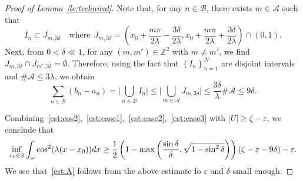 \documentclass[10pt,a4paper]{amsart}
\newcommand{\R}{\mathbb{R}}
\def \d {{\rm{d}}}
\begin{document}
\begin{proof}[Proof of Lemma~\ref{le:technical}]
Note that, for any $n\in \mathcal{B}$, there exists $m\in\mathcal{A}$ such that 
\begin{equation*}
I_{n}\subset {J}_{m,3\delta}\quad \mbox{where}\ \ 
{J}_{m,3\delta}=\left(x_{0}+\frac{m \pi }{2\lambda}-\frac{3\delta}{2\lambda},x_{0}+\frac{m \pi }{2\lambda}+\frac{3\delta}{2\lambda}\right)\cap(0,1).
\end{equation*}
Next, from $0<\delta\ll 1$, for any $(m,m')\in \mathbb{Z}^{2}$ with $m\ne m'$, we find ${J}_{m,3\delta}\cap
{J}_{m',3\delta}=\emptyset$.
Therefore, using the fact that $\left\{I_{n}\right\}_{n=1}^{N}$ are disjoint intervals and $\# \mathcal{A}\le 3\lambda$, we obtain
    \begin{equation}\label{est:case3}
   \sum_{n\in \mathcal{B}}(b_{n}-a_{n})=\bigg|\bigcup\limits_{n\in \mathcal{B}}I_{n}\bigg|\le \bigg|\bigcup\limits_{m\in \mathcal{A}}{J}_{m,3\delta}\bigg|\le \frac{3\delta}{\lambda}\#\mathcal{A}\le  9\delta.
   \end{equation}
   

   Combining~\eqref{est:cos2},~\eqref{est:case1},~\eqref{est:case2},~\eqref{est:case3} with $|U|\ge \zeta-\varepsilon$, we conclude that 
   \begin{equation*}
    \inf_{x_{0}\in \R}\int_{\omega}\cos^{2}(\lambda(x-x_{0}))\d x\ge \frac{1}{2}\left(1-\max\left(\frac{\sin \delta}{\delta},\sqrt{1-\sin^{2}\delta}\right)\right)(\zeta-\varepsilon-9\delta)-\varepsilon.
   \end{equation*}
   We see that~\eqref{est:A} follows from the above estimate fo $\varepsilon$ and $\delta$ small enough.
\end{proof}
\end{document}
